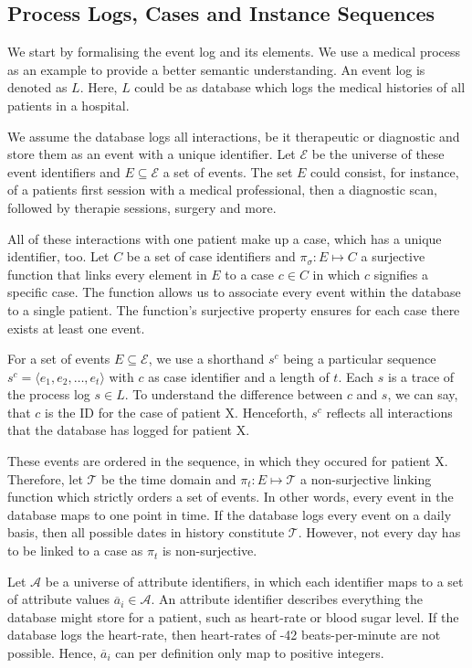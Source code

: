 \documentclass[./../../paper.tex]{subfiles}
\begin{document}
\subsection{Process Logs, Cases and Instance Sequences}


We start by formalising the event log and its elements. We use a medical process as an example to provide a better semantic understanding. An event log is denoted as $L$. Here, $L$ could be as database which logs the medical histories of all patients in a hospital. 

We assume the database logs all interactions, be it therapeutic or diagnostic and store them as an event with a unique identifier. Let $\mathcal{E}$ be the universe of  these event identifiers and $E \subseteq \mathcal{E}$ a set of events. The set $E$ could consist, for instance, of a patients first session with a medical professional, then a diagnostic scan, followed by therapie sessions, surgery and more. 

All of these interactions with one patient make up a case, which has a unique identifier, too. Let $C$ be a set of case identifiers and $\pi_\sigma : E \mapsto C$ a surjective function that links every element in $E$ to a case $c \in C$ in which $c$ signifies a specific case. The function allows us to associate every event within the database to a single patient. The function's surjective property ensures for each case there exists at least one event.

For a set of events $E \subseteq \mathcal{E}$, we use a shorthand $s^c$ being a particular sequence $s^c = \langle e_1, e_2, \ldots, e_t \rangle$ with $c$ as case identifier and a length of $t$. Each $s$ is a trace of the process log $s \in L$. To understand the difference between $c$ and $s$, we can say, that $c$ is the ID for the case of patient X. Henceforth, $s^c$ reflects all interactions that the database has logged for patient X. 


These events are ordered in the sequence, in which they occured for patient X.  Therefore, let $\mathcal{T}$ be the time domain and $\pi_t : E \mapsto \mathcal{T}$ a non-surjective linking function which strictly orders a set of events. In other words, every event in the database maps to one point in time. If the database logs every event on a daily basis, then all possible dates in history constitute $\mathcal{T}$. However, not every day has to be linked to a case as $\pi_t$ is non-surjective. 

Let $\mathcal{A}$ be a universe of attribute identifiers,  in which each identifier maps to a set of attribute values $\overline{a}_i \in \mathcal{A}$. An attribute identifier describes everything the database might store for a patient, such as heart-rate or blood sugar level. If the database logs the heart-rate, then heart-rates of -42 beats-per-minute are not possible. Hence, $\overline{a}_i$ can per definition only map to positive integers. 
\end{document}
